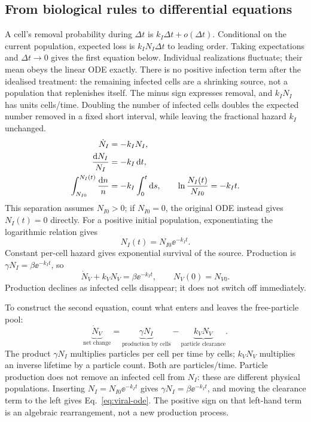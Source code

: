 \subsection{From biological rules to differential equations}\label{subsec:infected-cells}
A cell's removal probability during $\Delta t$ is $k_I\Delta t+o(\Delta t)$. Conditional on the current population, expected loss is $k_IN_I\Delta t$ to leading order. Taking expectations and $\Delta t\to0$ gives the first equation below. Individual realizations fluctuate; their mean obeys the linear ODE exactly.
There is no positive infection term after the idealised treatment: the remaining infected cells are a shrinking source, not a population that replenishes itself. The minus sign expresses removal, and $k_IN_I$ has units cells/time. Doubling the number of infected cells doubles the expected number removed in a fixed short interval, while leaving the fractional hazard $k_I$ unchanged.
\begin{align}
\dot N_I&=-k_IN_I,\label{eq:infected-ode}\\
\frac{\mathrm{d} N_I}{N_I}&=-k_I\,\mathrm{d} t,\notag\\
\int_{N_{I0}}^{N_I(t)}\frac{\mathrm{d} n}{n}&=-k_I\int_0^t\mathrm{d} s,
\qquad \ln\frac{N_I(t)}{N_{I0}}=-k_It.\label{eq:infected-integral}
\end{align}
This separation assumes $N_{I0}>0$; if $N_{I0}=0$, the original ODE instead gives $N_I(t)=0$ directly. For a positive initial population, exponentiating the logarithmic relation gives
\begin{equation}\label{eq:infected-solution}
\boxed{N_I(t)=N_{I0}\ee^{-k_It}.}
\end{equation}
Constant per-cell hazard gives exponential survival of the source. Production is $\gamma N_I=\beta\ee^{-k_It}$, so
\begin{equation}\label{eq:viral-ode}
\boxed{\dot N_V+k_VN_V=\beta\ee^{-k_It},\qquad N_V(0)=N_{V0}.}
\end{equation}
Production declines as infected cells disappear; it does not switch off immediately.

To construct the second equation, count what enters and leaves the free-particle pool:
\begin{equation}\label{eq:viral-term-balance}
\underbrace{\dot N_V}_{\text{net change}}
=\underbrace{\gamma N_I}_{\text{production by cells}}
-\underbrace{k_VN_V}_{\text{particle clearance}}.
\end{equation}
The product $\gamma N_I$ multiplies particles per cell per time by cells; $k_VN_V$ multiplies an inverse lifetime by a particle count. Both are particles/time. Particle production does not remove an infected cell from $N_I$: these are different physical populations. Inserting $N_I=N_{I0}\ee^{-k_It}$ gives $\gamma N_I=\beta\ee^{-k_It}$, and moving the clearance term to the left gives Eq.~\eqref{eq:viral-ode}. The positive sign on that left-hand term is an algebraic rearrangement, not a new production process.


